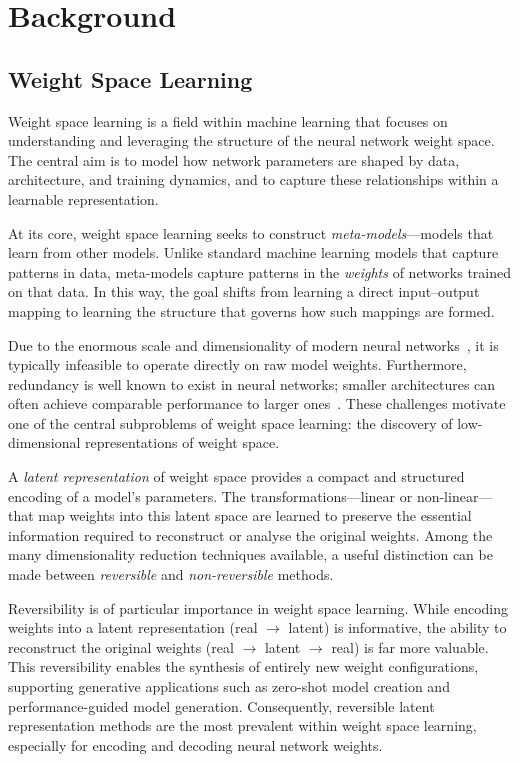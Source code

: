 \chapter{Background}
\label{chap:background}

    
\section{Weight Space Learning}

Weight space learning is a field within machine learning that focuses on understanding and leveraging the structure of the neural network weight space. The central aim is to model how network parameters are shaped by data, architecture, and training dynamics, and to capture these relationships within a learnable representation. 

At its core, weight space learning seeks to construct \textit{meta-models}—models that learn from other models. Unlike standard machine learning models that capture patterns in data, meta-models capture patterns in the \textit{weights} of networks trained on that data. In this way, the goal shifts from learning a direct input--output mapping to learning the structure that governs how such mappings are formed.

Due to the enormous scale and dimensionality of modern neural networks~\cite{}, it is typically infeasible to operate directly on raw model weights. Furthermore, redundancy is well known to exist in neural networks; smaller architectures can often achieve comparable performance to larger ones~\cite{}. These challenges motivate one of the central subproblems of weight space learning: the discovery of low-dimensional representations of weight space.

A \textit{latent representation} of weight space provides a compact and structured encoding of a model's parameters. The transformations—linear or non-linear—that map weights into this latent space are learned to preserve the essential information required to reconstruct or analyse the original weights. Among the many dimensionality reduction techniques available, a useful distinction can be made between \textit{reversible} and \textit{non-reversible} methods.

Reversibility is of particular importance in weight space learning. While encoding weights into a latent representation (real $\rightarrow$ latent) is informative, the ability to reconstruct the original weights (real $\rightarrow$ latent $\rightarrow$ real) is far more valuable. This reversibility enables the synthesis of entirely new weight configurations, supporting generative applications such as zero-shot model creation and performance-guided model generation. Consequently, reversible latent representation methods are the most prevalent within weight space learning, especially for encoding and decoding neural network weights.

